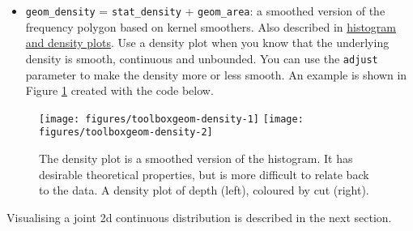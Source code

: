 \begin{itemize}
\itemsep1pt\parskip0pt
\item
  \texttt{geom\_density} = \texttt{stat\_density} + \texttt{geom\_area}:
  a smoothed version of the frequency polygon based on kernel smoothers.
  Also described in \hyperref[sub:distribution]{histogram and density
  plots}. Use a density plot when you know that the underlying density
  is smooth, continuous and unbounded. You can use the \texttt{adjust}
  parameter to make the density more or less smooth. An example is shown
  in Figure \ref{fig:geom-density} created with the code below.
    
\end{itemize}

\begin{Shaded}
\begin{Highlighting}[]
\NormalTok{, } \NormalTok{(}\NormalTok{, }\NormalTok{))}
\NormalTok{, } \NormalTok{(}\NormalTok{, }\NormalTok{), }
        \NormalTok{(}\NormalTok{))}
\end{Highlighting}
\end{Shaded}

\begin{figure}

{\centering \texttt{[image: figures/toolboxgeom-density-1]} \texttt{[image: figures/toolboxgeom-density-2]} 

}

\caption{The density plot is a smoothed version of the histogram. It has desirable theoretical properties, but is more difficult to relate back to the data. A density plot of depth (left), coloured by cut (right).\label{fig:geom-density}}
\end{figure}

Visualising a joint 2d continuous distribution is described in the next
section.


